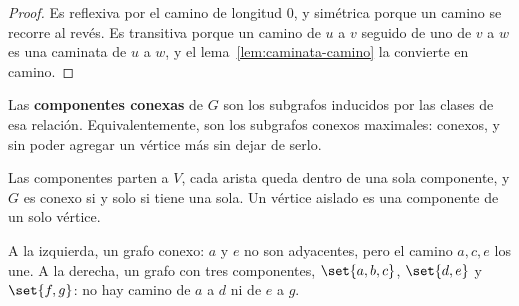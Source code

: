\documentclass[11pt,letterpaper]{article}
\begin{document}
\begin{proof}
  Es reflexiva por el camino de longitud $0$, y simétrica porque un
  camino se recorre al revés. Es transitiva porque un camino de $u$ a
  $v$ seguido de uno de $v$ a $w$ es una caminata de $u$ a $w$, y el
  lema~\ref{lem:caminata-camino} la convierte en camino.
\end{proof}

\begin{definicion}
  \label{def:componente-conexa}
  Las \textbf{componentes conexas} de $G$ son los subgrafos inducidos
  por las clases de esa relación. Equivalentemente, son los subgrafos
  conexos maximales: conexos, y sin poder agregar un vértice más sin
  dejar de serlo.
\end{definicion}

Las componentes parten a $V$, cada arista queda dentro de una sola
componente, y $G$ es conexo si y solo si tiene una sola. Un vértice
aislado es una componente de un solo vértice.

\begin{ejemplo}[Diapositivas 95 y 100]
  \label{ej:componentes-teoria}
  A la izquierda, un grafo conexo: $a$ y $e$ no son adyacentes, pero
  el camino $a, c, e$ los une. A la derecha, un grafo con tres
  componentes, $\set{a,b,c}$, $\set{d,e}$ y $\set{f,g}$: no hay camino
  de $a$ a $d$ ni de $e$ a $g$.
  \begin{center}
  \end{center}
\end{ejemplo}
\end{document}
